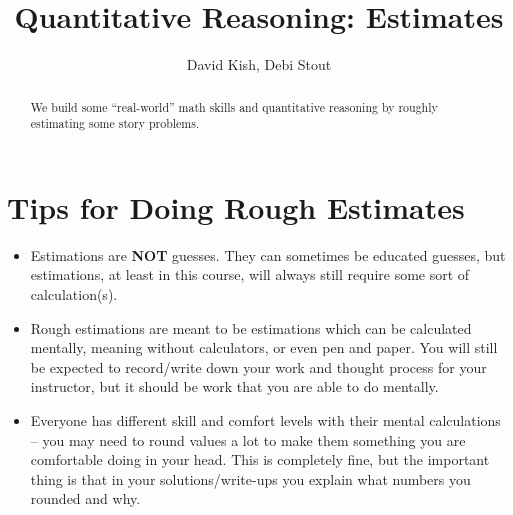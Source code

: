 \documentclass{ximera}
\author{David Kish, Debi Stout}
\title{Quantitative Reasoning: Estimates}
\begin{document}
\licenseAPC
\begin{abstract}
We build some ``real-world'' math skills and quantitative reasoning by roughly estimating some story problems.
\end{abstract}
\maketitle




\section{Tips for Doing Rough Estimates} 
\begin{itemize}
\item Estimations are \textbf{NOT} guesses.  They can sometimes be educated guesses, but estimations, at least in this course, will always still require some sort of calculation(s).
\item Rough estimations are meant to be estimations which can be calculated mentally, meaning without calculators, or even pen and paper.  You will still be expected to record/write down your work and thought process for your instructor, but it should be work that you are able to do mentally.
\item Everyone has different skill and comfort levels with their mental calculations -- you may need to round values a lot to make them something you are comfortable doing in your head.  This is completely fine, but the important thing is that in your solutions/write-ups you explain what numbers you rounded and why.
\end{itemize}
\end{document}
